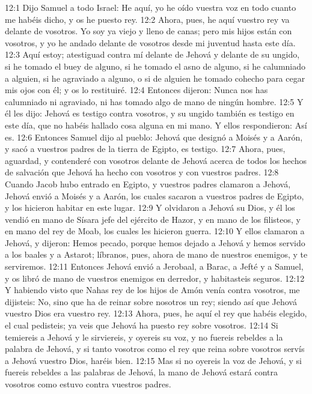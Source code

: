 12:1 Dijo Samuel a todo Israel: He aquí, yo he oído vuestra voz en todo cuanto me habéis dicho, y os he puesto rey.  
12:2 Ahora, pues, he aquí vuestro rey va delante de vosotros. Yo soy ya viejo y lleno de canas; pero mis hijos están con vosotros, y yo he andado delante de vosotros desde mi juventud hasta este día.  
12:3 Aquí estoy; atestiguad contra mí delante de Jehová y delante de su ungido, si he tomado el buey de alguno, si he tomado el asno de alguno, si he calumniado a alguien, si he agraviado a alguno, o si de alguien he tomado cohecho para cegar mis ojos con él; y os lo restituiré.  
12:4 Entonces dijeron: Nunca nos has calumniado ni agraviado, ni has tomado algo de mano de ningún hombre.  
12:5 Y él les dijo: Jehová es testigo contra vosotros, y su ungido también es testigo en este día, que no habéis hallado cosa alguna en mi mano. Y ellos respondieron: Así es.  
12:6 Entonces Samuel dijo al pueblo: Jehová que designó a Moisés y a Aarón, y sacó a vuestros padres de la tierra de Egipto, es testigo.  
12:7 Ahora, pues, aguardad, y contenderé con vosotros delante de Jehová acerca de todos los hechos de salvación que Jehová ha hecho con vosotros y con vuestros padres.  
12:8 Cuando Jacob hubo entrado en Egipto, y vuestros padres clamaron a Jehová, Jehová envió a Moisés y a Aarón, los cuales sacaron a vuestros padres de Egipto, y los hicieron habitar en este lugar.  
12:9 Y olvidaron a Jehová su Dios, y él los vendió en mano de Sísara jefe del ejército de Hazor, y en mano de los filisteos, y en mano del rey de Moab, los cuales les hicieron guerra.  
12:10 Y ellos clamaron a Jehová, y dijeron: Hemos pecado, porque hemos dejado a Jehová y hemos servido a los baales y a Astarot; líbranos, pues, ahora de mano de nuestros enemigos, y te serviremos. 
12:11 Entonces Jehová envió a Jerobaal, a Barac, a Jefté y a Samuel, y os libró de mano de vuestros enemigos en derredor, y habitasteis seguros.  
12:12 Y habiendo visto que Nahas rey de los hijos de Amón venía contra vosotros, me dijisteis: No, sino que ha de reinar sobre nosotros un rey; siendo así que Jehová vuestro Dios era vuestro rey.  
12:13 Ahora, pues, he aquí el rey que habéis elegido, el cual pedisteis; ya veis que Jehová ha puesto rey sobre vosotros.  
12:14 Si temiereis a Jehová y le sirviereis, y oyereis su voz, y no fuereis rebeldes a la palabra de Jehová, y si tanto vosotros como el rey que reina sobre vosotros servís a Jehová vuestro Dios, haréis bien.  
12:15 Mas si no oyereis la voz de Jehová, y si fuereis rebeldes a las palabras de Jehová, la mano de Jehová estará contra vosotros como estuvo contra vuestros padres.  
